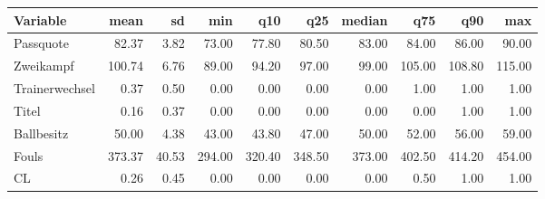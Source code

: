 \begin{table}[ht]
\centering
\begin{tabular}{lrrrrrrrrr}
  \hline
Variable & mean & sd & min & q10 & q25 & median & q75 & q90 & max \\ 
  \hline
Passquote & 82.37 & 3.82 & 73.00 & 77.80 & 80.50 & 83.00 & 84.00 & 86.00 & 90.00 \\ 
  Zweikampf & 100.74 & 6.76 & 89.00 & 94.20 & 97.00 & 99.00 & 105.00 & 108.80 & 115.00 \\ 
  Trainerwechsel & 0.37 & 0.50 & 0.00 & 0.00 & 0.00 & 0.00 & 1.00 & 1.00 & 1.00 \\ 
  Titel & 0.16 & 0.37 & 0.00 & 0.00 & 0.00 & 0.00 & 0.00 & 1.00 & 1.00 \\ 
  Ballbesitz & 50.00 & 4.38 & 43.00 & 43.80 & 47.00 & 50.00 & 52.00 & 56.00 & 59.00 \\ 
  Fouls & 373.37 & 40.53 & 294.00 & 320.40 & 348.50 & 373.00 & 402.50 & 414.20 & 454.00 \\ 
  CL & 0.26 & 0.45 & 0.00 & 0.00 & 0.00 & 0.00 & 0.50 & 1.00 & 1.00 \\ 
   \hline
\end{tabular}
\end{table}
